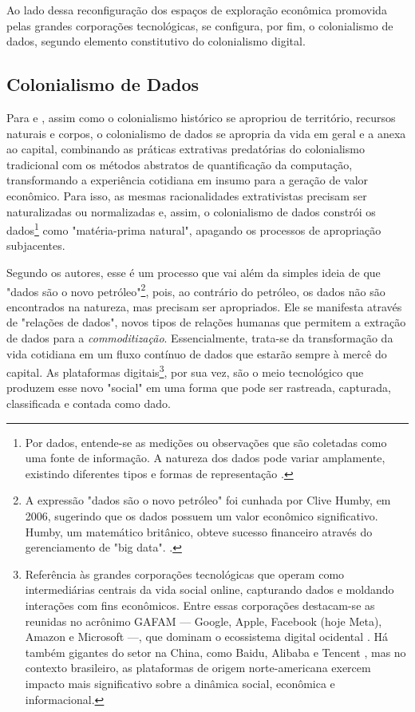 Ao lado dessa reconfiguração dos espaços de exploração econômica promovida pelas grandes corporações tecnológicas, se configura, por fim, o colonialismo de dados, segundo elemento constitutivo do colonialismo digital.

\subsection{Colonialismo de Dados}
\label{subsec:colDados}

Para  e , assim como o colonialismo histórico se apropriou de território, recursos naturais e corpos, o colonialismo de dados se apropria da vida em geral e a anexa ao capital, combinando as práticas extrativas predatórias do colonialismo tradicional com os métodos abstratos de quantificação da computação, transformando a experiência cotidiana em insumo para a geração de valor econômico. Para isso, as mesmas racionalidades extrativistas precisam ser naturalizadas ou normalizadas e, assim, o  colonialismo de dados constrói os dados\footnote{
Por dados, entende-se as medições ou observações que são coletadas como uma fonte de informação. A natureza dos dados pode variar amplamente, existindo diferentes tipos e formas de representação \cite{data_2025}.
} como "matéria-prima natural", apagando os processos de apropriação subjacentes.

Segundo os autores, esse é um processo que vai além da simples ideia de que "dados são o novo petróleo"\footnote{
A expressão "dados são o novo petróleo" foi cunhada por Clive Humby, em 2006, sugerindo que os dados possuem um valor econômico significativo. Humby, um matemático britânico, obteve sucesso financeiro através do gerenciamento de "big data". \cite{arthur_2013}.
}, pois, ao contrário do petróleo, os dados não são encontrados na natureza, mas precisam ser apropriados. Ele se manifesta através de "relações de dados", novos tipos de relações humanas que permitem a extração de dados para a \textit{commoditização}. Essencialmente, trata-se da transformação da vida cotidiana em um fluxo contínuo de dados que estarão sempre à mercê do capital. As plataformas digitais\footnote{
Referência às grandes corporações tecnológicas que operam como intermediárias centrais da vida social online, capturando dados e moldando interações com fins econômicos. Entre essas corporações destacam-se as reunidas no acrônimo GAFAM — Google, Apple, Facebook (hoje Meta), Amazon e Microsoft —, que dominam o ecossistema digital ocidental \cite{couldry2018, Silveira2021, Reis2024, röhe_2024}. Há também gigantes do setor na China, como Baidu, Alibaba e Tencent \cite{couldry2018}, mas no contexto brasileiro, as plataformas de origem norte-americana exercem impacto mais significativo sobre a dinâmica social, econômica e informacional.
}, por sua vez, são o meio tecnológico que produzem esse novo "social" em uma forma que pode ser rastreada, capturada, classificada e contada como dado. 

